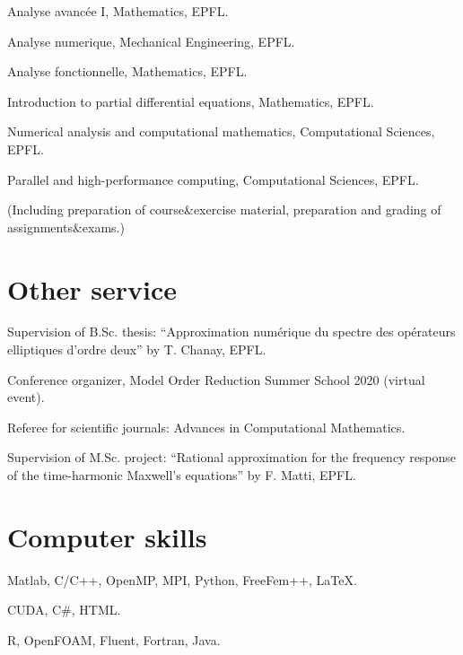 \documentclass[11pt]{article} %
\begin{document}
\hspace{\parindent}Analyse avanc\'ee I, Mathematics, EPFL.

Analyse numerique, Mechanical Engineering, EPFL.

\yearsminus Analyse fonctionnelle, Mathematics, EPFL.

Introduction to partial differential equations, Mathematics, EPFL.

Numerical analysis and computational mathematics, Computational Sciences, EPFL.

Parallel and high-performance computing, Computational Sciences, EPFL.

\smallskip

\hspace{-\leftskip}(Including preparation of course\&exercise material, preparation and grading of assignments\&exams.)

\section*{Other service}

\hspace{\parindent}Supervision of B.Sc. thesis: ``Approximation num\'erique du spectre des op\'erateurs elliptiques d'ordre deux'' by T. Chanay, EPFL.

Conference organizer, Model Order Reduction Summer School 2020 (virtual event).

\yearsminus Referee for scientific journals: Advances in Computational Mathematics.

Supervision of M.Sc. project: ``Rational approximation for the frequency response of the time-harmonic Maxwell's equations'' by F. Matti, EPFL.

\section*{Computer skills}

\hspace{\parindent}Matlab, C/C++, OpenMP, MPI, Python, FreeFem++, \LaTeX.

CUDA, C\#, HTML.

R, OpenFOAM, Fluent, Fortran, Java.

\end{document}
